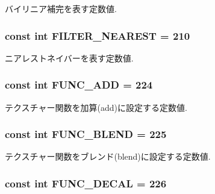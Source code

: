 バイリニア補完を表す定数値. \hypertarget{classm3g_1_1Texture2D_1ee2e06d6462fdafd5f17e63eddfb8fe}{
\subsubsection[{FILTER\_\-NEAREST}]{\setlength{\rightskip}{0pt plus 5cm}const int {\bf FILTER\_\-NEAREST} = 210}}
\label{classm3g_1_1Texture2D_1ee2e06d6462fdafd5f17e63eddfb8fe}


ニアレストネイバーを表す定数値. \hypertarget{classm3g_1_1Texture2D_825ea3aff59f79958257ac557c802760}{
\subsubsection[{FUNC\_\-ADD}]{\setlength{\rightskip}{0pt plus 5cm}const int {\bf FUNC\_\-ADD} = 224}}
\label{classm3g_1_1Texture2D_825ea3aff59f79958257ac557c802760}


テクスチャー関数を加算(add)に設定する定数値. \hypertarget{classm3g_1_1Texture2D_57e3e01014bbfd62b8665586fdd2ecb3}{
\subsubsection[{FUNC\_\-BLEND}]{\setlength{\rightskip}{0pt plus 5cm}const int {\bf FUNC\_\-BLEND} = 225}}
\label{classm3g_1_1Texture2D_57e3e01014bbfd62b8665586fdd2ecb3}


テクスチャー関数をブレンド(blend)に設定する定数値. \hypertarget{classm3g_1_1Texture2D_235b942b18219513ca4a5a8c1a3171ac}{
\subsubsection[{FUNC\_\-DECAL}]{\setlength{\rightskip}{0pt plus 5cm}const int {\bf FUNC\_\-DECAL} = 226}}
\label{classm3g_1_1Texture2D_235b942b18219513ca4a5a8c1a3171ac}


